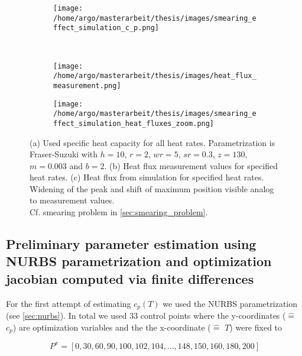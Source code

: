 \documentclass{scrartcl}[12pt, halfparskip]
\numberwithin{equation}{section}
\numberwithin{figure}{section}
\numberwithin{table}{section}
\begin{document}
\begin{figure}[H]
	\centering
	\begin{subfigure}{0.9\textwidth}
		\centering
		\texttt{[image: /home/argo/masterarbeit/thesis/images/smearing\_effect\_simulation\_c\_p.png]}
		\caption{}
		\label{fig:smearing_effect_c_p}
	\end{subfigure} \\
	\begin{subfigure}{0.49\textwidth}
		\texttt{[image: /home/argo/masterarbeit/thesis/images/heat\_flux\_measurement.png]}
		\caption{}
		\label{fig:smearing_effect_measurement_heat_flux}
	\end{subfigure}
	\begin{subfigure}{0.49\textwidth}
		\texttt{[image: /home/argo/masterarbeit/thesis/images/smearing\_effect\_simulation\_heat\_fluxes\_zoom.png]}
		\caption{}
		\label{fig:smearing_effect_simulation_heat_flux}
	\end{subfigure}
	\caption{(a) Used specific heat capacity for all heat rates. Parametrization is Fraser-Suzuki with $h=10$, $r=2$, $wr=5$, $sr=0.3$, $z=130$, $m=0.003$ and $b=2$. (b) Heat flux measurement values for specified heat rates. (c) Heat flux from simulation for specified heat rates. Widening of the peak and shift of maximum position visible analog to measurement values. \\
	Cf. smearing problem in \cref{sec:smearing_problem}.}
\end{figure}



\subsection{Preliminary parameter estimation using NURBS parametrization and optimization jacobian computed via finite differences}
\label{sec:param_estim_NURBS}

For the first attempt of estimating $c_p(T)$  we used the NURBS parametrization (see \cref{sec:nurbs}). In total we used 33 control points where the y-coordinates ($\hat{=}$ $c_p$) are optimization variables and the the x-coordinate ($\hat{=}$ $T$) were fixed to 

\begin{equation}
	P^x = [0, 30, 60, 90, 100, 102, 104, ..., 148, 150, 160, 180, 200]
\end{equation}
\end{document}
